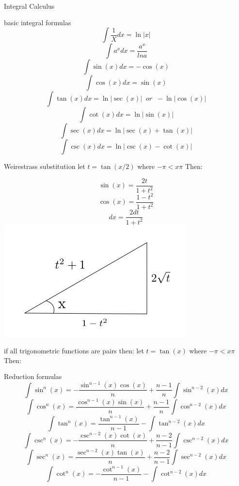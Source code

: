 \newpage
\begin{section}{Integral Calculus}
	\begin{subsection}{basic integral formulas}
		$$\int \frac{1}{X} dx = \ln \vert x \vert$$
		$$\int a^{x} dx = \frac{a^x}{ln a } $$
		$$\int \sin (x) dx = -\cos (x) $$
		$$\int \cos (x) dx = \sin (x) $$
		$$\int \tan (x) dx = \ln \vert \sec (x) \vert \;\;or\;\; - \ln \vert \cos (x) \vert$$
		$$\int \cot (x) dx = \ln \vert \sin (x) \vert $$
		$$\int \sec (x) dx = \ln \vert \sec (x) + \tan (x) \vert $$
		$$\int \csc (x) dx = \ln \vert \csc (x) - \cot (x) \vert $$

	\end{subsection}
	\begin{subsection}{Weirestrass substitution}
		let $ t = \tan ( x/2 ) $ where $-\pi < x \pi $ Then:

		$$ \sin (x) = \frac{2t}{1+t^2} $$ 
		$$ \cos (x) = \frac{1-t^2}{1+t^2} $$
		$$ dx = \frac{2dt}{1 + t^2} $$
		\includegraphics[]{1.png}

		if all trigonometric functions are pairs then:
		let $ t = \tan ( x ) $ where $-\pi < x \pi $ Then:


	\end{subsection}
	\begin{subsection}{Reduction formulas}
		$$\int \sin^n (x) = - \frac{\sin^{n-1}(x)\cos(x)}{n} + \frac{n-1}{n} \int \sin^{n-2} (x) dx $$ 
		$$\int \cos^n (x) =  \frac{\cos^{n-1}(x)\sin(x)}{n} + \frac{n-1}{n} \int \cos^{n-2} (x) dx $$ 
		$$\int \tan^n (x) =  \frac{\tan^{n-1}(x)}{n-1}  - \int \tan^{n-2} (x) dx $$ 
		$$\int \csc^n (x) = - \frac{\csc^{n-2}(x)\cot(x)}{n} + \frac{n-2}{n-1} \int \csc^{n-2} (x) dx $$ 
		$$\int \sec^n (x) =  \frac{\sec^{n-2}(x)\tan(x)}{n} + \frac{n-2}{n-1} \int \sec^{n-2} (x) dx $$ 
		$$\int \cot^n (x) =  -\frac{\cot^{n-1}(x)}{n-1}  - \int \cot^{n-2} (x) dx $$ 




\end{subsection}
\end{section}
